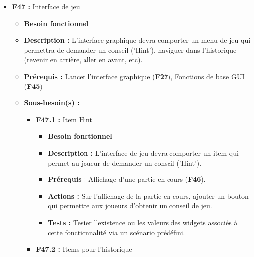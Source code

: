 \documentclass{article}
\begin{document}
\begin{itemize}
\begin{itemize}
\begin{itemize}
\begin{itemize}
                \item \textbf{Actions :} Depuis le menu principal, il doit être possible de voir l'aide du jeu via un bouton qui redirige vers une fenêtre spécifique, cette dernière comportant un bouton de retour vers le menu principal.
                \item \textbf{Tests :} Tester l'existence ou les valeurs des widgets associés à cette fonctionnalité via un scénario prédéfini.
            \end{itemize}
        \end{itemize}
    \end{itemize}
\bigskip
    \item \textbf{F47 :} Interface de jeu
    \begin{itemize}
        \item \textbf{Besoin fonctionnel}
        \item \textbf{Description :} L’interface graphique devra comporter un menu de jeu qui permettra de demander un conseil (’Hint’), naviguer dans l’historique (revenir en arrière, aller en avant, etc).
        \item \textbf{Prérequis :} Lancer l’interface graphique (\textbf{F27}), Fonctions de base GUI (\textbf{F45})
        \item \textbf{Sous-besoin(s) :}
        \begin{itemize}
            \smallskip
            \item \textbf{F47.1 :} Item Hint
            \begin{itemize}
                \item \textbf{Besoin fonctionnel}
                \item \textbf{Description :} L'interface de jeu devra comporter un item qui permet au joueur de demander un conseil (’Hint’).
                \item \textbf{Prérequis :} Affichage d'une partie en cours (\textbf{F46}).
                \item \textbf{Actions :} Sur l’affichage de la partie en cours, ajouter un bouton qui permettre aux joueurs d'obtenir un conseil de jeu.
                \item \textbf{Tests :} Tester l'existence ou les valeurs des widgets associés à cette fonctionnalité via un scénario prédéfini.
            \end{itemize}
            \smallskip
            \item \textbf{F47.2 :} Items pour l’historique
            \begin{itemize}

\end{itemize}
\end{itemize}
\end{itemize}
\end{itemize}
\end{document}
